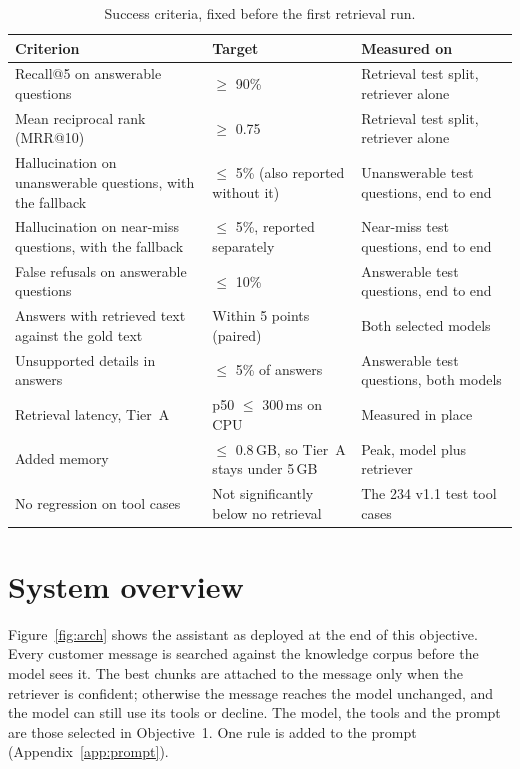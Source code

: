 \documentclass[11pt,a4paper]{article}
\begin{document}
\begin{table}[H]
\centering
\small
\begin{tabularx}{\textwidth}{L l L}
\toprule
Criterion & Target & Measured on \\
\midrule
Recall@5 on answerable questions & $\ge$ 90\% & Retrieval test split, retriever alone \\
Mean reciprocal rank (MRR@10) & $\ge$ 0.75 & Retrieval test split, retriever alone \\
Hallucination on unanswerable questions, with the fallback & $\le$ 5\% (also reported without it) & Unanswerable test
questions, end to end \\
Hallucination on near-miss questions, with the fallback & $\le$ 5\%, reported separately & Near-miss test questions,
end to end \\
False refusals on answerable questions & $\le$ 10\% & Answerable test questions, end to end \\
Answers with retrieved text against the gold text & Within 5 points (paired) & Both selected models \\
Unsupported details in answers & $\le$ 5\% of answers & Answerable test questions, both models \\
Retrieval latency, Tier~A & p50 $\le$ 300\,ms on CPU & Measured in place \\
Added memory & $\le$ 0.8\,GB, so Tier~A stays under 5\,GB & Peak, model plus retriever \\
No regression on tool cases & Not significantly below no retrieval & The 234 v1.1 test tool cases \\
\bottomrule
\end{tabularx}
\caption{Success criteria, fixed before the first retrieval run.}
\label{tab:criteria}
\end{table}

\section{System overview}\label{sec:system}

Figure~\ref{fig:arch} shows the assistant as deployed at the end of this objective. Every customer message is
searched against the knowledge corpus before the model sees it. The best chunks are attached to the message only when
the retriever is confident; otherwise the message reaches the model unchanged, and the model can still use its tools
or decline. The model, the tools and the prompt are those selected in Objective~1. One rule is added to the prompt
(Appendix~\ref{app:prompt}).
\end{document}
